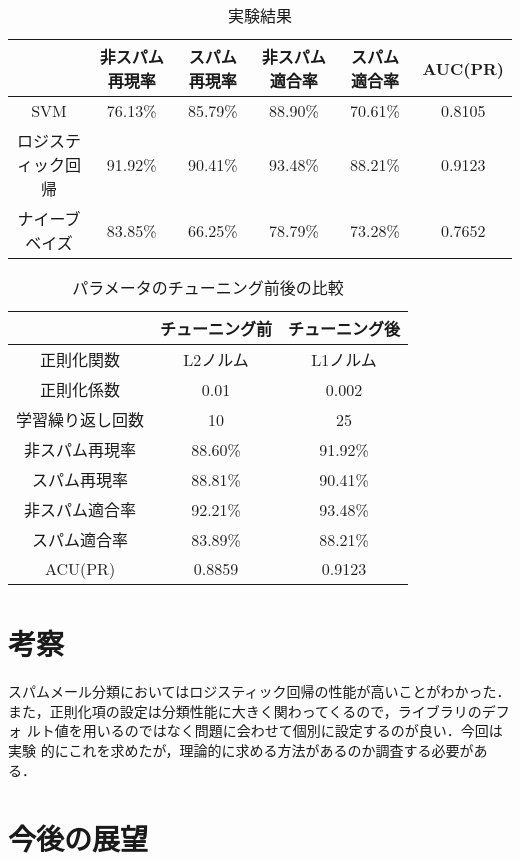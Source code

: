 \documentclass[a4paper,12pt]{jarticle}
\begin{document}
\begin{table}[bt]
\centering
\caption{実験結果}
\label{tab:実験結果}
\fontsize{9pt}{10pt}\selectfont
\begin{tabular}{|c|c|c|c|c|c|} \hline
 &非スパム再現率&スパム再現率&非スパム適合率&スパム適合率&AUC(PR) \\ \hline
SVM& 76.13\%& 85.79\%& 88.90\%& 70.61\% & 0.8105 \\ \hline
ロジスティック回帰&91.92\% & 90.41\% & 93.48\% & 88.21\% & 0.9123 \\ \hline
ナイーブベイズ& 83.85\% & 66.25\% & 78.79\%  & 73.28\% & 0.7652  \\ \hline
\end{tabular}
\end{table}

\begin{table}[bt]
\centering
\caption{パラメータのチューニング前後の比較}
\label{tab:パラメータのチューニング前後の比較}
\fontsize{9pt}{10pt}\selectfont
\begin{tabular}{|c|c|c|} \hline
 &チューニング前&チューニング後 \\ \hline
正則化関数& L2ノルム & L1ノルム \\ \hline
正則化係数&0.01 & 0.002 \\ \hline
学習繰り返し回数  &10 & 25  \\ \hline \hline
非スパム再現率& 88.60\%& 91.92\% \\ \hline
スパム再現率& 88.81\%& 90.41\% \\ \hline
非スパム適合率& 92.21\%& 93.48\% \\ \hline
スパム適合率& 83.89\%& 88.21\% \\ \hline
ACU(PR)& 0.8859 &0.9123 \\ \hline
\end{tabular}
\end{table}


\section{考察}
スパムメール分類においてはロジスティック回帰の性能が高いことがわかった．
また，正則化項の設定は分類性能に大きく関わってくるので，ライブラリのデフォ
ルト値を用いるのではなく問題に会わせて個別に設定するのが良い．今回は実験
的にこれを求めたが，理論的に求める方法があるのか調査する必要がある．

\section{今後の展望}
\end{document}
